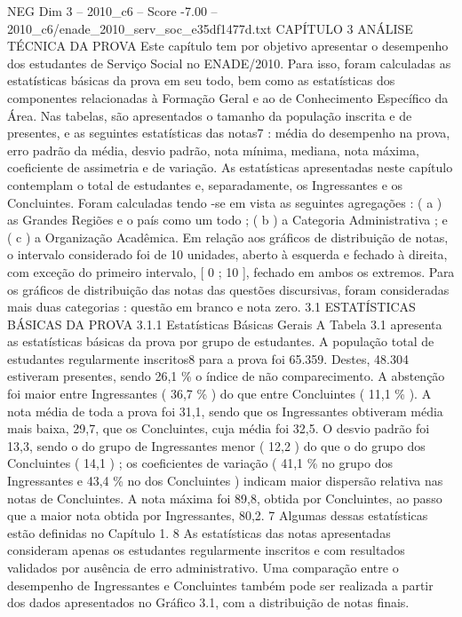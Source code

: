\begin{textsample}{NEG Dim 3 – 2010\_c6 – Score -7.00 – 2010\_c6/enade\_2010\_serv\_soc\_e35df1477d.txt}  \label{ex:f3_neg_016}
CAPÍTULO 3 ANÁLISE TÉCNICA DA PROVA Este capítulo tem por objetivo apresentar o desempenho dos estudantes de Serviço Social no ENADE/2010.
Para isso, foram calculadas as estatísticas básicas da prova em seu todo, bem como as estatísticas dos componentes relacionadas à Formação Geral e ao de Conhecimento Específico da Área.
Nas tabelas, são apresentados o tamanho da população inscrita e de presentes, e as seguintes estatísticas das notas7 : média do desempenho na prova, erro padrão da média, desvio padrão, nota mínima, mediana, nota máxima, coeficiente de assimetria e de variação.
As estatísticas apresentadas neste capítulo contemplam o total de estudantes e, separadamente, os Ingressantes e os Concluintes.
Foram calculadas tendo -se em vista as seguintes agregações : ( a ) as Grandes Regiões e o país como um todo ; ( b ) a Categoria Administrativa ; e ( c ) a Organização Acadêmica.
Em relação aos gráficos de distribuição de notas, o intervalo considerado foi de 10 unidades, aberto à esquerda e fechado à direita, com exceção do primeiro intervalo, [ 0 ; 10 ], fechado em ambos os extremos.
Para os gráficos de distribuição das notas das questões discursivas, foram consideradas mais duas categorias : questão em branco e nota zero. 3.1 ESTATÍSTICAS BÁSICAS DA PROVA 3.1.1 Estatísticas Básicas Gerais A Tabela 3.1 apresenta as estatísticas básicas da prova por grupo de estudantes.
A população total de estudantes regularmente inscritos8 para a prova foi 65.359.
Destes, 48.304 estiveram presentes, sendo 26,1 \% o índice de não comparecimento.
A abstenção foi maior entre Ingressantes ( 36,7 \% ) do que entre Concluintes ( 11,1 \% ).
A nota média de toda a prova foi 31,1, sendo que os Ingressantes obtiveram média mais baixa, 29,7, que os Concluintes, cuja média foi 32,5.
O desvio padrão foi 13,3, sendo o do grupo de Ingressantes menor ( 12,2 ) do que o do grupo dos Concluintes ( 14,1 ) ; os coeficientes de variação ( 41,1 \% no grupo dos Ingressantes e 43,4 \% no dos Concluintes ) indicam maior dispersão relativa nas notas de Concluintes.
A nota máxima foi 89,8, obtida por Concluintes, ao passo que a maior nota obtida por Ingressantes, 80,2. 7 Algumas dessas estatísticas estão definidas no Capítulo 1. 8 As estatísticas das notas apresentadas consideram apenas os estudantes regularmente inscritos e com resultados validados por ausência de erro administrativo.
Uma comparação entre o desempenho de Ingressantes e Concluintes também pode ser realizada a partir dos dados apresentados no Gráfico 3.1, com a distribuição de notas finais.

\end{textsample}
